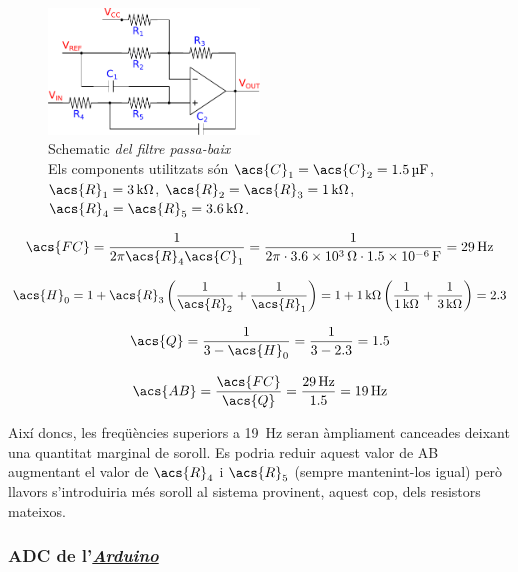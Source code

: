 \begin{figure}[htp]
	\centering
	\includegraphics[width=0.5\textwidth]{Figures/schematic_filtre_p-baix.pdf}
	\caption[Filtre passa-baix]{Schematic\textit{ del filtre passa-baix}\\{\footnotesize Els components utilitzats són $ \acs{C}_1 = \acs{C}_2 = \SI{1.5}{\micro\farad} $, $ \acs{R}_1 = \SI{3}{\kilo\ohm} $, $ \acs{R}_2 = \acs{R}_3 = \SI{1}{\kilo\ohm} $, $ \acs{R}_4 = \acs{R}_5 = \SI{3.6}{\kilo\ohm} $.}}
	\label{fig:schematic_filtre_p-baix}
\end{figure}

\begin{equation}
\acs{FC} = \frac{\num{1}}{\num{2}\pi\acs{R}_4\acs{C}_1} = \frac{\num{1}}{\num{2}\pi\cdot\SI{3.6e3}{\ohm}\cdot\SI{1.5e-6}{\farad}} = \SI{29}{\hertz}
\end{equation}

\begin{equation}
\acs{H}_0 = \num{1} + \acs{R}_3\left(\frac{\num{1}}{\acs{R}_2} + \frac{\num{1}}{\acs{R}_1}\right) = \num{1} + \SI{1}{\kilo\ohm}\left(\frac{\num{1}}{\SI{1}{\kilo\ohm}} + \frac{\num{1}}{\SI{3}{\kilo\ohm}}\right) = \num{2.3}
\end{equation}

\begin{equation}
\acs{Q} = \frac{\num{1}}{\num{3} - \acs{H}_0} = \frac{\num{1}}{\num{3} - \num{2.3}} = \num{1.5}
\end{equation}

\begin{equation}
\acs{AB} = \frac{\acs{FC}}{\acs{Q}} = \frac{\SI{29}{\hertz}}{\num{1.5}} = \SI{19}{\hertz}
\end{equation}

Així doncs, les freqüències superiors a \SI{19}{\hertz} seran àmpliament cance\lgem ades deixant una quantitat marginal de soroll. Es podria reduir aquest valor de \ac{AB} augmentant el valor de $ \acs{R}_4 $ i $ \acs{R}_5 $ (sempre mantenint-los igual) però llavors s'introduiria més soroll al sistema provinent, aquest cop, dels resistors mateixos.

\subsubsection{\acs{ADC} de l'\hyperref[subsec:arduino]{\textit{Arduino}}}

